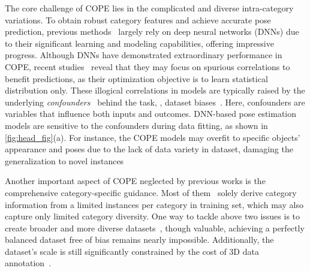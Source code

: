 The core challenge of COPE lies in the complicated and diverse intra-category variations. To obtain robust category features and achieve accurate pose prediction, previous methods~\cite{di2022gpv,lin2022category,zheng2023hs,lin2023vi,lin2024clipose,liu2024mh6d,lin2024instance,chen2024secondpose,zheng2024georef} largely rely on deep neural networks (DNNs) due to their significant learning and modeling capabilities, offering impressive progress.
Although DNNs have demonstrated extraordinary performance in COPE, recent studies~\cite{ilyas2019adversarial,wang2024vision} reveal that they may focus on spurious correlations to benefit predictions, as their optimization objective is to learn statistical distribution only.
These illogical correlations in models are typically raised by the underlying \emph{confounders}~\cite{pearl2018book} behind the task, \eg, dataset biases~\cite{jung2024housecat6d,zhang2024omni6d}. Here, confounders are variables that influence both inputs and outcomes. 
DNN-based pose estimation models are sensitive to the confounders during data fitting, as shown in \cref{fig:head_fig}(a). For instance, the COPE models may overfit to specific objects' appearance and poses due to the lack of data variety in dataset, damaging the generalization to novel instances

Another important aspect of COPE neglected by previous works is the comprehensive category-specific guidance. Most of them~\cite{di2022gpv,lin2023vi,liu2023net,lin2024instance,chen2024secondpose} solely derive category information from a limited instances per category in training set, which may also capture only limited category diversity.
One way to tackle above two issues is to create broader and more diverse datasets~\cite{fu2022category,wang2022phocal,jung2024housecat6d,zhang2024omni6d}, though valuable, achieving a perfectly balanced dataset free of bias remains nearly impossible. Additionally, the dataset's scale is still significantly constrained by the cost of 3D data annotation~\cite{zhang2024pcp}.

